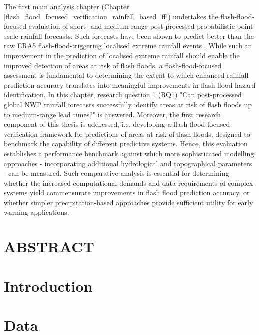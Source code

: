 The first main analysis chapter (Chapter \ref{flash_flood_focused_verification_rainfall_based_ff}) undertakes the flash-flood-focused evaluation of short- and medium-range post-processed probabilistic point-scale rainfall forecasts. Such forecasts have been shown to predict better than the raw ERA5 flash-flood-triggering localised extreme rainfall events \citep{Pillosu_2025a}. While such an improvement in the prediction of localised extreme rainfall should enable the improved detection of areas at risk of flash floods, a flash-flood-focused assessment is fundamental to determining the extent to which enhanced rainfall prediction accuracy translates into meaningful improvements in flash flood hazard identification. In this chapter, \textcolor{colour_chapter7}{research question 1 (RQ1) "Can post-processed global NWP rainfall forecasts successfully identify areas at risk of flash floods up to medium-range lead times?"} is answered. Moreover, the first research component of this thesis is addressed, i.e. \textcolor{colour_chapter5}{developing a flash-flood-focused verification framework for predictions of areas at risk of flash floods, designed to benchmark the capability of different predictive systems}. Hence, this evaluation establishes a performance benchmark against which more sophisticated modelling approaches - incorporating additional hydrological and topographical parameters - can be measured. Such comparative analysis is essential for determining whether the increased computational demands and data requirements of complex systems yield commensurate improvements in flash flood prediction accuracy, or whether simpler precipitation-based approaches provide sufficient utility for early warning applications.

\clearpage

\section*{ABSTRACT}

\clearpage



\section{Introduction}


\section{Data}


